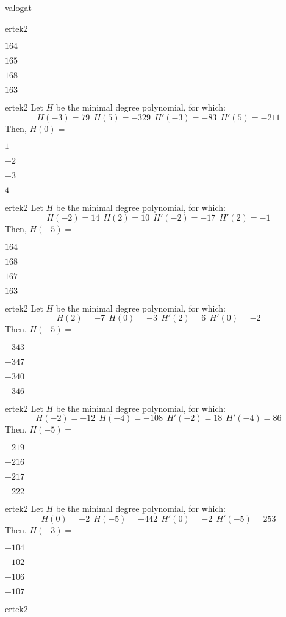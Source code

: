 \documentclass[12pt]{article}
\begin{document}
\begin{quiz}{valogat}
\begin{multi}{ertek2}
\item* $ 164 $
\item  $ 165 $
\item  $ 168 $
\item  $ 163 $
\end{multi}\begin{multi}{ertek2}
Let $H$ be the minimal degree polynomial, for which:
$$
H(-3)=79\ \ H(5)=-329 \ \ H'(-3)=-83 \ \ H'(5)=-211
$$
Then, $H(0)=$
\item* $ 1 $
\item  $ -2 $
\item  $ -3 $
\item  $ 4 $
\end{multi}\begin{multi}{ertek2}
Let $H$ be the minimal degree polynomial, for which:
$$
H(-2)=14\ \ H(2)=10 \ \ H'(-2)=-17 \ \ H'(2)=-1
$$
Then, $H(-5)=$
\item* $ 164 $
\item  $ 168 $
\item  $ 167 $
\item  $ 163 $
\end{multi}\begin{multi}{ertek2}
Let $H$ be the minimal degree polynomial, for which:
$$
H(2)=-7\ \ H(0)=-3 \ \ H'(2)=6 \ \ H'(0)=-2
$$
Then, $H(-5)=$
\item* $ -343 $
\item  $ -347 $
\item  $ -340 $
\item  $ -346 $
\end{multi}\begin{multi}{ertek2}
Let $H$ be the minimal degree polynomial, for which:
$$
H(-2)=-12\ \ H(-4)=-108 \ \ H'(-2)=18 \ \ H'(-4)=86
$$
Then, $H(-5)=$
\item* $ -219 $
\item  $ -216 $
\item  $ -217 $
\item  $ -222 $
\end{multi}\begin{multi}{ertek2}
Let $H$ be the minimal degree polynomial, for which:
$$
H(0)=-2\ \ H(-5)=-442 \ \ H'(0)=-2 \ \ H'(-5)=253
$$
Then, $H(-3)=$
\item* $ -104 $
\item  $ -102 $
\item  $ -106 $
\item  $ -107 $
\end{multi}\begin{multi}{ertek2}

\end{multi}
\end{quiz}
\end{document}
